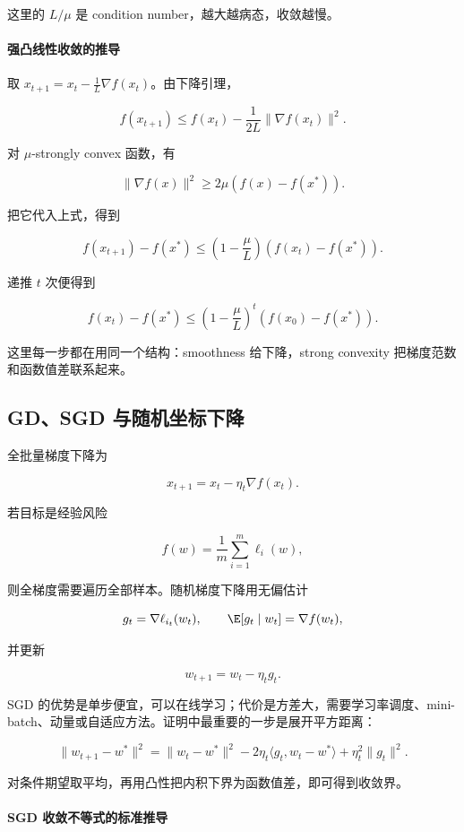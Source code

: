 这里的 \(L/\mu\) 是 condition number，越大越病态，收敛越慢。

\paragraph{强凸线性收敛的推导}

取 \(x_{t+1}=x_t-\frac1L\nabla f(x_t)\)。由下降引理，

\[
  f(x_{t+1})
  \le
  f(x_t)
  -
  \frac{1}{2L}\|\nabla f(x_t)\|^2.
\]

对 \(\mu\)-strongly convex 函数，有

\[
  \|\nabla f(x)\|^2
  \ge
  2\mu(f(x)-f(x^*)).
\]

把它代入上式，得到

\[
  f(x_{t+1})-f(x^*)
  \le
  \left(1-\frac{\mu}{L}\right)
  (f(x_t)-f(x^*)).
\]

递推 \(t\) 次便得到

\[
  f(x_t)-f(x^*)
  \le
  \left(1-\frac{\mu}{L}\right)^t
  (f(x_0)-f(x^*)).
\]

这里每一步都在用同一个结构：smoothness 给下降，strong convexity 把梯度范数和函数值差联系起来。

\subsection{GD、SGD 与随机坐标下降}


全批量梯度下降为

\[
  x_{t+1}=x_t-\eta_t\nabla f(x_t).
\]

若目标是经验风险

\[
  f(w)=\frac1m\sum_{i=1}^{m}\ell_i(w),
\]

则全梯度需要遍历全部样本。随机梯度下降用无偏估计

\[
  g_t=\nabla \ell_{i_t}(w_t),
  \qquad
  \E[g_t\mid w_t]=\nabla f(w_t),
\]

并更新

\[
  w_{t+1}=w_t-\eta_t g_t.
\]

SGD 的优势是单步便宜，可以在线学习；代价是方差大，需要学习率调度、mini-batch、动量或自适应方法。证明中最重要的一步是展开平方距离：

\[
  \|w_{t+1}-w^*\|^2
  =
  \|w_t-w^*\|^2
  -
  2\eta_t\langle g_t,w_t-w^*\rangle
  +
  \eta_t^2\|g_t\|^2.
\]

对条件期望取平均，再用凸性把内积下界为函数值差，即可得到收敛界。

\paragraph{SGD 收敛不等式的标准推导}

